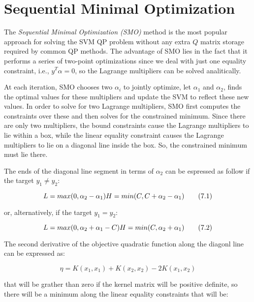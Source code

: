 \section{Sequential Minimal Optimization}

The \emph{Sequential Minimal Optimization (SMO)} \cite{platt1998sequential} method is the most popular approach for solving the SVM QP problem without any extra $Q$ matrix storage required by common QP methods. The advantage of SMO lies in the fact that it performs a series of two-point optimizations since we deal with just one equality constraint, i.e., $y^T \alpha=0$, so the Lagrange multipliers can be solved analitically.

At each iteration, SMO chooses two $\alpha_i$ to jointly optimize, let $\alpha_1$ and $\alpha_2$, finds the optimal values for these multipliers and update the SVM to reflect these new values. In order to solve for two Lagrange multipliers, SMO first computes the constraints over these and then solves for the constrained minimum. Since there are only two multipliers, the bound constraints cause the Lagrange multipliers to lie within a box, while the linear equality constraint causes the Lagrange multipliers to lie on a diagonal line inside the box. So, the constrained minimum must lie there.

The ends of the diagonal line segment in terms of $\alpha_2$ can be espressed as follow if the target $y_1 \ne y_2$:

\begin{equation}
L = max(0, \alpha_2 - \alpha_1) \\
H = min(C, C + \alpha_2 - \alpha_1) \tag{7.1}
\end{equation}

or, alternatively, if the target $y_1 = y_2$:

\begin{equation}
L = max(0, \alpha_2 + \alpha_1 - C) \\
H = min(C, \alpha_2 + \alpha_1) \tag{7.2}
\end{equation}

The second derivative of the objective quadratic function along the diagonl line can be expressed as:

\begin{equation}
\eta = K(x_1, x_1) + K(x_2, x_2) - 2K(x_1, x_2) \tag{7.3}
\end{equation}

that will be grather than zero if the kernel matrix will be positive definite, so there will be a minimum along the linear equality constraints that will be:

